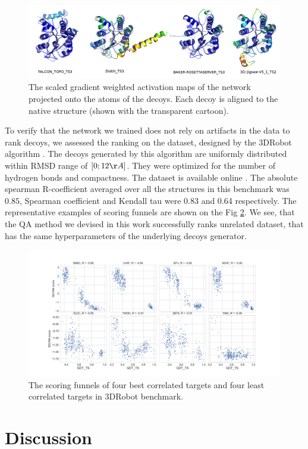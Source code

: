 \documentclass[letter,10pt]{article}
\begin{document}
\begin{figure}[H]
    \centering
    \includegraphics[width=\linewidth]{Fig/T0776.png}
    \caption{The scaled gradient weighted activation maps of the network projected onto the atoms of the decoys. 
    Each decoy is aligned to the native structure (shown with the transparent cartoon).}
    \label{Fig:GradCAMT0776_more}
\end{figure}

To verify that the network we trained does not rely on artifacts in the data to rank decoys, we assessed the ranking on the dataset, designed 
by the 3DRobot algorithm \cite{deng20163drobot}. The decoys generated by this algorithm are 
uniformly distributed within RMSD range of $[0; 12\AA]$. They 
were optimized for the number of hydrogen bonds and compactness. The dataset is available online \cite{3DRobotDS}.
The absolute spearman R-coefficient averaged over all the structures in this benchmark was $0.85$, Spearman coefficient and Kendall tau were
0.83 and 0.64 respectively. The representative examples of scoring funnels are shown on the Fig \ref{Fig:3DRobotBenchmark}. 
We see, that the QA method we devised
in this work successfully ranks unrelated dataset, that has the same hyperparameters of the underlying decoys generator.

\begin{figure}[H]
    \centering
    \includegraphics[width=\linewidth]{Fig/3DRobot_set_sFinal_funnels.png}
    \caption{The scoring funnels of four best correlated targets and four least correlated targets in 3DRobot benchmark.}
    \label{Fig:3DRobotBenchmark}
\end{figure}

\section{Discussion}

{}

\end{document}
